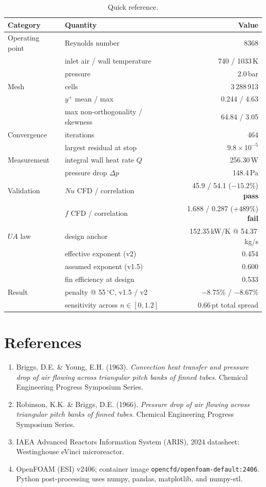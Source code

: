 \documentclass[11pt]{article}
\newcommand{\co}{$^\circ$C}
\newcommand{\file}[1]{\texttt{\small #1}}
\begin{document}
\begin{table}[h]\centering\small
\caption{Quick reference.}\label{tab:quick}
\begin{tabular}{@{}llr@{}}
\toprule
Category & Quantity & Value\\
\midrule
Operating point & Reynolds number & 8368\\
 & inlet air / wall temperature & 740 / 1033\,K\\
 & pressure & 2.0\,bar\\
Mesh & cells & 3\,288\,913\\
 & $y^+$ mean / max & 0.244 / 4.63\\
 & max non-orthogonality / skewness & 64.84 / 3.05\\
Convergence & iterations & 464\\
 & largest residual at stop & $9.8\times10^{-5}$\\
Measurement & integral wall heat rate $Q$ & 256.30\,W\\
 & pressure drop $\Delta p$ & 148.4\,Pa\\
Validation & $Nu$ CFD / correlation & 45.9 / 54.1 ($-15.2\%$) \textbf{pass}\\
 & $f$ CFD / correlation & 1.688 / 0.287 ($+489\%$) \textbf{fail}\\
$UA$ law & design anchor & 152.35\,kW/K @ 54.37\,kg/s\\
 & effective exponent (v2) & 0.454\\
 & assumed exponent (v1.5) & 0.600\\
 & fin efficiency at design & 0.533\\
Result & penalty @ 55\,\co, v1.5 / v2 & $-8.75\%$ / $-8.67\%$\\
 & sensitivity across $n\in[0,1.2]$ & 0.66\,pt total spread\\
\bottomrule
\end{tabular}
\end{table}

\section{References}

\begin{enumerate}[leftmargin=1.6em,itemsep=2pt]
\item Briggs, D.E. \& Young, E.H. (1963). \emph{Convection heat transfer and pressure drop of air flowing
across triangular pitch banks of finned tubes}. Chemical Engineering Progress Symposium Series.
\item Robinson, K.K. \& Briggs, D.E. (1966). \emph{Pressure drop of air flowing across triangular pitch banks
of finned tubes}. Chemical Engineering Progress Symposium Series.
\item IAEA Advanced Reactors Information System (ARIS), 2024 datasheet: Westinghouse eVinci microreactor.
\item OpenFOAM (ESI) v2406; container image \file{opencfd/openfoam-default:2406}. Python post-processing uses
numpy, pandas, matplotlib, and numpy-stl.
\end{enumerate}
\end{document}
